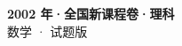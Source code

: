 \documentclass[zihao=-4, a4paper]{ctexart}
\begin{document}
\begin{center}
  {\Large\bfseries 2002 年·全国新课程卷·理科}\\[4pt]
  {\large 数学 · 试题版}
\end{center}
\medskip
{}

\end{document}
